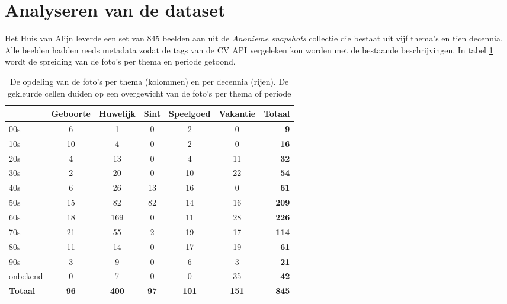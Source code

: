 \section{Analyseren van de dataset}
\label{sec:analyseren-van-de-dataset}

Het Huis van Alijn leverde een set van 845 beelden aan uit de \textit{Anonieme snapshots} collectie die bestaat uit vijf thema’s en tien decennia. Alle beelden hadden reeds metadata zodat de tags van de CV API vergeleken kon worden met de bestaande beschrijvingen. In tabel  \ref{tab:analyse-dataset} wordt de spreiding van de foto’s per thema en periode getoond.


\begin{table}
	\centering
	\begin{tabular}{l|ccccc|r}
		\toprule
		& Geboorte & Huwelijk & Sint & Speelgoed & Vakantie & Totaal \\
		\midrule
		00s & 6 & 1 & 0 &2 & 0 & \textbf{9} \\
		10s & 10 & 4 & 0 & 2 & 0 & \textbf{16} \\
		20s & 4 & 13 & 0 & 4 & 11 & \textbf{32} \\
		30s & 2 & 20 & 0 & 10 & 22 & \textbf{54} \\
		40s & 6 & 26 & 13 & 16 & 0 & \textbf{61} \\
		50s & 15 & 82 & 82 & 14 & 16 & \textbf{209} \\
		60s & 18 & 169 & 0 & 11 & 28 & \textbf{226} \\
		70s & 21 & 55 & 2 & 19 & 17 & \textbf{114} \\
		80s & 11 & 14 & 0 & 17 & 19 & \textbf{61} \\
		90s & 3 & 9 & 0 & 6 & 3 & \textbf{21} \\
		onbekend & 0 & 7 & 0 & 0 & 35 & \textbf{42} \\
		\midrule
		\textbf{Totaal} & \textbf{96} & \textbf{400} & \textbf{97} & \textbf{101} & \textbf{151} & \textbf{845} \\
		\bottomrule
	\end{tabular}
	\caption[opdeling van de foto’s per thema en decennia]{De opdeling van de foto’s per thema (kolommen) en per decennia (rijen). De gekleurde cellen duiden op een overgewicht van de foto’s per thema of periode}
	\label{tab:analyse-dataset}
\end{table}

